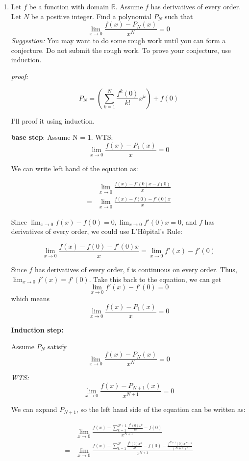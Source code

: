 \documentclass[12pt]{exam}
\newcommand {\DS} [1] {${\displaystyle #1}$}
\newcommand{\R}{\mathbb{R}}
\begin{document}
\begin{enumerate}
\begin{enumerate}

			

		\item  Let $f$ be a function with domain $\R$.  Assume $f$ has derivatives of every order.   Let $N$ be a positive integer.  Find a polynomial \DS{P_N} such that
			$$
				\lim_{x \to 0} \frac{f(x) - P_N(x)}{x^N} = 0
			$$
			\emph{Suggestion:} You may want to do some rough work until you can form a conjecture.    Do not submit the rough work.  To prove your conjecture, use induction.

			\emph{proof:}

			$$
			P_N = (\sum_{k = 1}^{N}\frac{f^k(0)}{k!}x^k) + f(0)
			$$

			I'll proof it using induction.

			\textbf{base step}: Assume N = 1.
			WTS:
			$$
				\lim_{x \to 0} \frac{f(x) - P_1(x)}{x} = 0
			$$

			We can write left hand of the equation as:

			\begin{align*}
				&\lim_{x \to 0} \frac{f(x) - f'(0)x - f(0)}{x} \\
				=& \lim_{x \to 0} \frac{f(x) - f(0) - f'(0)x}{x}
			\end{align*}

			Since $\lim_{x \to 0}{f(x) - f(0)} = 0, \lim_{x \to 0}{f'(0)x} = 0$, and  $f$ has derivatives of every order,
			we could use L'H\^{o}pital's Rule:

			$$
				\lim_{x \to 0} \frac{f(x) - f(0) - f'(0)x}{x}
				= \lim_{x \to 0} f'(x) - f'(0)
			$$

			Since $f$ has derivatives of every order, f is continuous on every order. 
			Thus, $\lim_{x \to 0} f'(x) = f'(0)$. 
			Take this back to the equation, we can get
			$$
				\lim_{x \to 0} f'(x) - f'(0) = 0
			$$
			which means 
			$$
				\lim_{x \to 0} \frac{f(x) - P_1(x)}{x} = 0
			$$

			\textbf{Induction step:}
			
			Assume $P_N$ satisfy $$\lim_{x \to 0} \frac{f(x) - P_N(x)}{x^N} = 0$$

			\emph{WTS:} $$\lim_{x \to 0} \frac{f(x) - P_{N+1}(x)}{x^{N+1}} = 0$$ 
			
			We can expand $P_{N+1}$, so the left hand side of the equation can be written as:

			\begin{align*}
				&\lim_{x \to 0} \frac{f(x) - \sum_{k = 1}^{N + 1} \frac{f^k(0)x^k}{k!} - f(0)}{x^{N + 1}} \\
				=& \lim_{x \to 0} \frac{f(x) - \sum_{k = 1}^{N} \frac{f^k(0)x^k}{k!} - f(0) - \frac{f^{N + 1}(0)x^{N + 1}}{(N + 1)!}}{x^{N + 1}} \\
			\end{align*}


\end{enumerate}
\end{enumerate}
\end{document}
